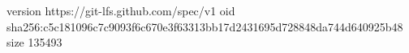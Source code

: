 version https://git-lfs.github.com/spec/v1
oid sha256:c5c181096c7c9093f6c670e3f63313bb17d2431695d728848da744d640925b48
size 135493
